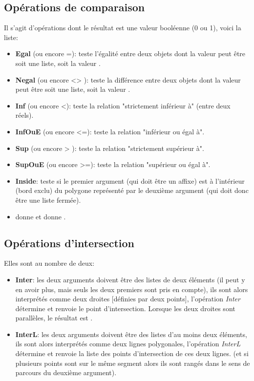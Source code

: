 \subsection{Opérations de comparaison}

Il s'agit d'opérations dont le résultat est une valeur booléenne (0 ou 1), voici la liste:

\begin{itemize}
 \item \textbf{Egal} (ou encore =): teste l'égalité entre deux objets dont la valeur peut être soit une liste, soit la valeur \Nil.
 \item \textbf{Negal} (ou encore <> ): teste la différence entre deux objets dont la valeur peut être soit une liste, soit la valeur \Nil.
 \item \textbf{Inf} (ou encore <): teste la relation "strictement inférieur à" (entre deux réels).
 \item \textbf{InfOuE} (ou encore <=): teste la relation "inférieur ou égal à".
 \item \textbf{Sup} (ou encore > ): teste la relation "strictement supérieur à".
 \item \textbf{SupOuE} (ou encore >=): teste la relation "supérieur ou égal à".
 \item \textbf{Inside}: teste si le premier argument (qui doit être un affixe) est à l'intérieur (bord exclu) du polygone représenté par le deuxième argument (qui doit donc être une liste fermée).
 \item \exem {} donne  et  donne .
\end{itemize}

\subsection{Opérations d'intersection}

Elles sont au nombre de deux:

\begin{itemize}
 \item \textbf{Inter}: les deux arguments doivent être des listes de deux éléments (il peut y en avoir plus, mais seuls les deux premiers sont pris en compte), ils sont alors interprétés comme deux droites [définies par deux points], l'opération \textsl{Inter} détermine et renvoie le point d'intersection. Lorsque les deux droites sont parallèles, le résultat est \Nil.
 \item \textbf{InterL}: les deux arguments doivent être des listes d'au moins deux éléments, ils sont alors interprétés comme deux lignes polygonales, l'opération \textsl{InterL} détermine et renvoie la liste des points d'intersection de ces deux lignes.  (et si plusieurs points sont sur le même segment alors ils sont rangés dans le sens de parcours du deuxième argument).
\end{itemize}

